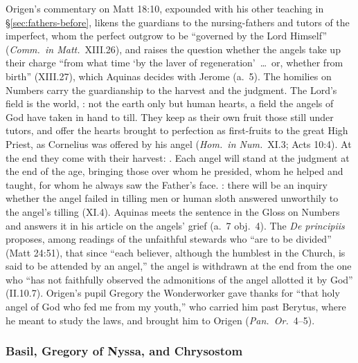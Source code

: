 Origen's commentary on Matt 18:10, expounded with his other teaching in
\S\ref{sec:fathers-before}, likens the guardians to the nursing-fathers and
tutors of the imperfect, whom the perfect outgrow to be ``governed by the
Lord Himself'' (\emph{Comm.\ in Matt.}\ XIII.26), and raises the question
whether the angels take up their charge ``from what time `by the laver of
regeneration'~\dots\ or, whether from birth'' (XIII.27), which Aquinas
decides with Jerome (a.~5). The homilies on Numbers carry the guardianship to
the harvest and the judgment. The Lord's field is the world, : not the earth only but human hearts, a field the
angels of God have taken in hand to till. They keep as their own fruit those
still under tutors, and offer the hearts brought to perfection as
first-fruits to the great High Priest, as Cornelius was offered by his angel
(\emph{Hom.\ in Num.}\ XI.3; Acts 10:4). At the end they come with their
harvest: . Each
angel will stand at the judgment at the end of the age, bringing those over
whom he presided, whom he helped and taught, for whom he always saw the
Father's face. : there will be an inquiry whether the angel failed in
tilling men or human sloth answered unworthily to the angel's tilling
(XI.4). Aquinas meets the sentence in the Gloss on Numbers and answers it in
his article on the angels' grief (a.~7 obj.~4). The \emph{De
principiis} proposes, among readings of the unfaithful stewards who ``are to
be divided'' (Matt 24:51), that since ``each believer, although the humblest in the Church, is
said to be attended by an angel,'' the angel is withdrawn at the end from the
one who ``has not faithfully observed the admonitions of the angel allotted it
by God'' (II.10.7). Origen's pupil Gregory the Wonderworker gave thanks for
``that holy angel of God who fed me from my youth,'' who carried him past
Berytus, where he meant to study the laws, and brought him to Origen
(\emph{Pan.\ Or.}\ 4--5).

\subsubsection{Basil, Gregory of Nyssa, and Chrysostom}

